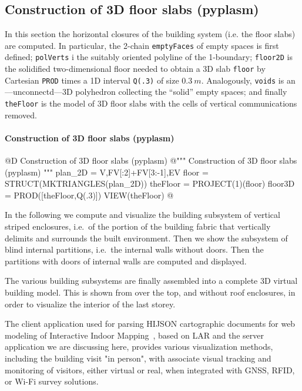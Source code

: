 \documentclass[11pt,oneside]{article}    %
\begin{document}
\subsection{Construction of 3D floor slabs (pyplasm)}

In this section the horizontal closures of the building system (i.e. the floor slabs) are computed.
In particular, the 2-chain \texttt{emptyFaces} of empty spaces is first defined; \texttt{polVerts} i the suitably oriented polyline of the 1-boundary; \texttt{floor2D} is the solidified two-dimensional floor needed to obtain a 3D slab \texttt{floor} by Cartesian \texttt{PROD} times a 1D interval \texttt{Q(.3)} of size $0.3\ m$. Analogously, \texttt{voids} is an---unconnectd---3D polyhedron collecting the ``solid'' empty spaces; and finally \texttt{theFloor} is the model of 3D floor slabs with the cells of vertical communications removed. 

\paragraph{Construction of 3D floor slabs (pyplasm)}
@D Construction of 3D floor slabs (pyplasm)
@{""" Construction of 3D floor slabs (pyplasm) """
plan_2D = V,FV[:2]+FV[3:-1],EV
floor = STRUCT(MKTRIANGLES(plan_2D))
theFloor = PROJECT(1)(floor)
floor3D = PROD([theFloor,Q(.3)])
VIEW(theFloor)
@}


In the following we compute and visualize the building subsystem of vertical striped enclosures, i.e.~of the portion of the building fabric that vertically delimits and surrounds the built environment. Then we show the subsystem of blind internal partitions, i.e.~the internal walls without doors. Then the partitions with doors of internal walls are computed and displayed.

The various building subsystems are finally assembled into a complete 3D virtual building model.
This is shown from over the top, and without roof enclosures, in order to visualize the interior of the last storey.

The client application used for parsing HIJSON cartographic documents for web modeling of Interactive Indoor Mapping~\cite{SpiniVSPMB-STAG2015,paoluzziMS:2014}, based on LAR and the server application we are discussing here, provides various visualization methods, including the building visit "in person", with associate visual tracking and monitoring of visitors, either virtual or real, when integrated with GNSS, RFID, or Wi-Fi survey solutions.
\end{document}
